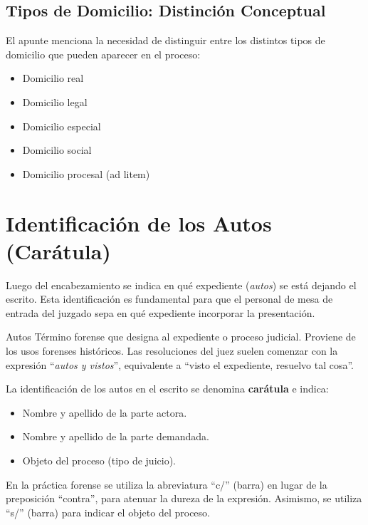 \documentclass[12pt,oneside]{book}
\begin{document}
\subsection{Tipos de Domicilio: Distinción Conceptual}

El apunte menciona la necesidad de distinguir entre los distintos tipos de domicilio que pueden aparecer en el proceso:

\begin{itemize}
    \item Domicilio real
    \item Domicilio legal
    \item Domicilio especial
    \item Domicilio social
    \item Domicilio procesal (ad litem)
\end{itemize}


\section{Identificación de los Autos (Carátula)}

Luego del encabezamiento se indica en qué expediente (\textit{autos}) se está dejando el escrito. Esta identificación es fundamental para que el personal de mesa de entrada del juzgado sepa en qué expediente incorporar la presentación.

\begin{definition}{Autos}
Término forense que designa al expediente o proceso judicial. Proviene de los usos forenses históricos. Las resoluciones del juez suelen comenzar con la expresión ``\textit{autos y vistos}'', equivalente a ``visto el expediente, resuelvo tal cosa''.
\end{definition}

La identificación de los autos en el escrito se denomina \textbf{carátula} e indica:
\begin{itemize}
    \item Nombre y apellido de la parte actora.
    \item Nombre y apellido de la parte demandada.
    \item Objeto del proceso (tipo de juicio).
\end{itemize}

En la práctica forense se utiliza la abreviatura ``c/'' (barra) en lugar de la preposición ``contra'', para atenuar la dureza de la expresión. Asimismo, se utiliza ``s/'' (barra) para indicar el objeto del proceso.
\end{document}
